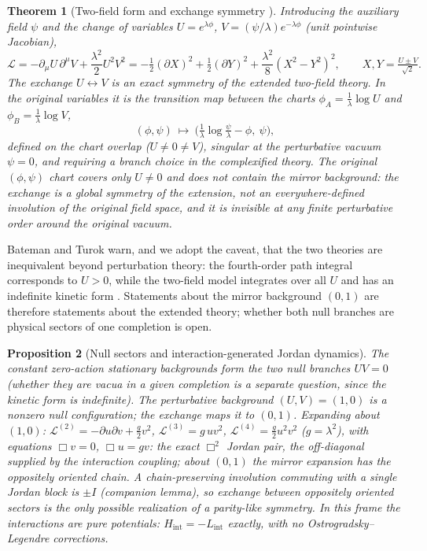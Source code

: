 \documentclass[11pt]{article}
\newtheorem{theorem}{Theorem}[section]
\newtheorem{proposition}[theorem]{Proposition}
\theoremstyle{definition}
\theoremstyle{remark}
\begin{document}
\begin{theorem}[Two-field form and exchange symmetry
{\cite[adapted]{BT2026}}]\label{thm:twofield}
Introducing the auxiliary field $\psi$ and the change of variables
$U=e^{\lambda\phi}$, $V=(\psi/\lambda)e^{-\lambda\phi}$ (unit pointwise
Jacobian),
\begin{equation}
\mathcal L
=-\partial_\mu U\,\partial^\mu V+\frac{\lambda^2}{2}U^2V^2
=-\tfrac12(\partial X)^2+\tfrac12(\partial Y)^2
+\frac{\lambda^2}{8}(X^2-Y^2)^2,
\qquad X,Y=\tfrac{U\pm V}{\sqrt2}.
\end{equation}
The exchange $U\leftrightarrow V$ is an exact symmetry \emph{of the
extended two-field theory}.  In the original variables it is the
transition map between the charts $\phi_A=\tfrac1\lambda\log U$ and
$\phi_B=\tfrac1\lambda\log V$,
\begin{equation}
(\phi,\psi)\ \longmapsto\
\Big(\tfrac1\lambda\log\tfrac{\psi}{\lambda}-\phi,\ \psi\Big),
\end{equation}
defined on the chart overlap ($U\neq0\neq V$), singular at the
perturbative vacuum $\psi=0$, and requiring a branch choice in the
complexified theory.  The original $(\phi,\psi)$ chart covers only
$U\neq0$ and does not contain the mirror background: the exchange is a
global symmetry of the extension, not an everywhere-defined involution
of the original field space, and it is invisible at any finite
perturbative order around the original vacuum.
\end{theorem}

Bateman and Turok warn, and we adopt the caveat, that the two theories
are inequivalent beyond perturbation theory: the fourth-order path
integral corresponds to $U>0$, while the two-field model integrates
over all $U$ and has an indefinite kinetic form \cite{BT2026}.
Statements about the mirror background $(0,1)$ are therefore
statements about the extended theory; whether both null branches are
physical sectors of one completion is open.

\begin{proposition}[Null sectors and interaction-generated Jordan
dynamics]\label{prop:sectors}
The constant zero-action stationary backgrounds form the two null
branches $UV=0$ (whether they are vacua in a given completion is a
separate question, since the kinetic form is indefinite).  The
perturbative background $(U,V)=(1,0)$ is a nonzero null configuration;
the exchange maps it to $(0,1)$.  Expanding about $(1,0)$:
$\mathcal L^{(2)}=-\partial u\partial v+\tfrac g2v^2$,
$\mathcal L^{(3)}=g\,uv^2$, $\mathcal L^{(4)}=\tfrac g2u^2v^2$
($g=\lambda^2$), with equations $\Box v=0$, $\Box u=gv$: the exact
$\Box^2$ Jordan pair, the off-diagonal supplied by the interaction
coupling; about $(0,1)$ the mirror expansion has the oppositely
oriented chain.  A chain-preserving involution commuting with a single
Jordan block is $\pm I$ (companion lemma), so exchange between
oppositely oriented sectors is the only possible realization of a
parity-like symmetry.  In this frame the interactions are pure
potentials: $H_{\mathrm{int}}=-L_{\mathrm{int}}$ exactly, with no
Ostrogradsky--Legendre corrections.
\end{proposition}
\end{document}
